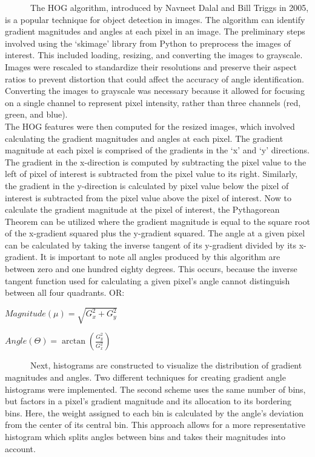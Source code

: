 \documentclass[
  letterpaper,
  DIV=11,
  numbers=noendperiod]{scrreprt}
\begin{document}
~~~~~~The HOG algorithm, introduced by Navneet Dalal and Bill Triggs in
2005, is a popular technique for object detection in images. The
algorithm can identify gradient magnitudes and angles at each pixel in
an image. The preliminary steps involved using the `skimage' library
from Python to preprocess the images of interest. This included loading,
resizing, and converting the images to grayscale. Images were rescaled
to standardize their resolutions and preserve their aspect ratios to
prevent distortion that could affect the accuracy of angle
identification. Converting the images to grayscale was necessary because
it allowed for focusing on a single channel to represent pixel
intensity, rather than three channels (red, green, and blue).\\
\hspace*{0.333em}\hspace*{0.333em}\hspace*{0.333em}\hspace*{0.333em}\hspace*{0.333em}\hspace*{0.333em}The
HOG features were then computed for the resized images, which involved
calculating the gradient magnitudes and angles at each pixel. The
gradient magnitude at each pixel is comprised of the gradients in the
`x' and `y' directions. The gradient in the x-direction is computed by
subtracting the pixel value to the left of pixel of interest is
subtracted from the pixel value to its right. Similarly, the gradient in
the y-direction is calculated by pixel value below the pixel of interest
is subtracted from the pixel value above the pixel of interest. Now to
calculate the gradient magnitude at the pixel of interest, the
Pythagorean Theorem can be utilized where the gradient magnitude is
equal to the square root of the x-gradient squared plus the y-gradient
squared. The angle at a given pixel can be calculated by taking the
inverse tangent of its y-gradient divided by its x-gradient. It is
important to note all angles produced by this algorithm are between zero
and one hundred eighty degrees. This occurs, because the inverse tangent
function used for calculating a given pixel's angle cannot distinguish
between all four quadrants. OR:

\(Magnitude(\mu)=\sqrt{G_{x}^{2} + G_{y}^{2}}\)

\(Angle(\Theta)=\arctan({\frac{G_{y}^{2}}{G_{x}^{2}}})\)

~~~~~~Next, histograms are constructed to visualize the distribution of
gradient magnitudes and angles. Two different techniques for creating
gradient angle histograms were implemented. The second scheme uses the
same number of bins, but factors in a pixel's gradient magnitude and its
allocation to its bordering bins. Here, the weight assigned to each bin
is calculated by the angle's deviation from the center of its central
bin. This approach allows for a more representative histogram which
splits angles between bins and takes their magnitudes into account.
\end{document}

